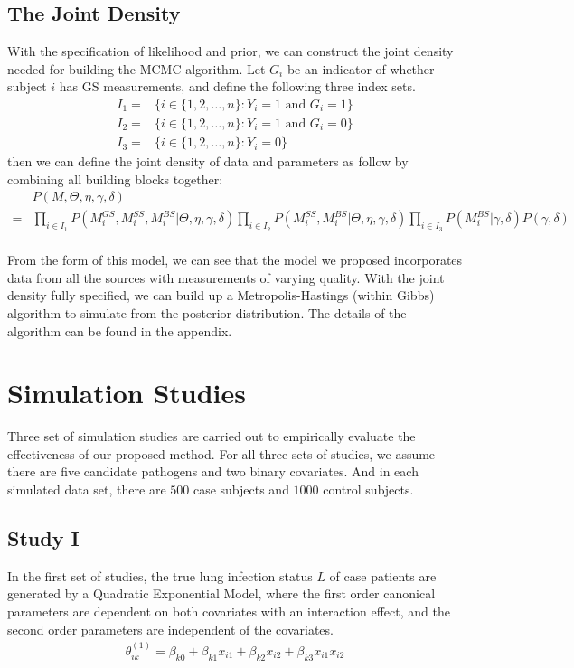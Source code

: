 \documentclass[11 pt, a4paper]{article}  %
\begin{document}
\subsection{The Joint Density}
With the specification of likelihood and prior, we can construct the joint density needed for building the MCMC algorithm. Let $G_i$ be an indicator of whether subject $i$ has GS measurements, and define the following three index sets.
\begin{align*}
I_1 = & \Big \{i \in \{1,2,\ldots, n\}: Y_i=1 \text{ and } G_i=1 \Big\}\\
I_2 = & \Big \{i \in \{1,2,\ldots, n\}: Y_i=1 \text{ and } G_i=0 \Big\}\\
I_3 = & \Big \{i \in \{1,2,\ldots, n\}: Y_i=0 \Big\}
\end{align*}
then we can define the joint density of data and parameters as follow by combining all building blocks together:
\begin{align*}
& P(M,\Theta, \eta, \gamma, \delta) \\
= & \prod_{i\in I_1} P(M_i^{GS},M_i^{SS},M_i^{BS} | \Theta, \eta, \gamma, \delta) 
\prod_{i\in I_2} P(M_i^{SS},M_i^{BS} |\Theta, \eta, \gamma, \delta)
\prod_{i\in I_3} P(M_i^{BS} |\gamma, \delta) P(\gamma, \delta)
\end{align*}
\\
From the form of this model, we can see that the model we proposed incorporates data from all the sources with measurements of varying quality. With the joint density fully specified, we can build up a Metropolis-Hastings (within Gibbs) algorithm to simulate from the posterior distribution. The details of the algorithm can be found in the appendix.


\newpage
\section{Simulation Studies}
Three set of simulation studies are carried out to empirically evaluate the effectiveness of our proposed method. For all three sets of studies, we assume there are five candidate pathogens and two binary covariates. And in each simulated data set, there are $500$ case subjects and $1000$ control subjects.

\subsection{Study I}
In the first set of studies, the true lung infection status $L$ of case patients are generated by a Quadratic Exponential Model, where the first order canonical parameters are dependent on both covariates with an interaction effect, and the second order parameters are independent of the covariates.
\begin{align*}
\theta^{(1)}_{ik} = \beta_{k0} + \beta_{k1} x_{i1} + \beta_{k2} x_{i2} + \beta_{k3} x_{i1} x_{i2}
\end{align*} 
\end{document}
